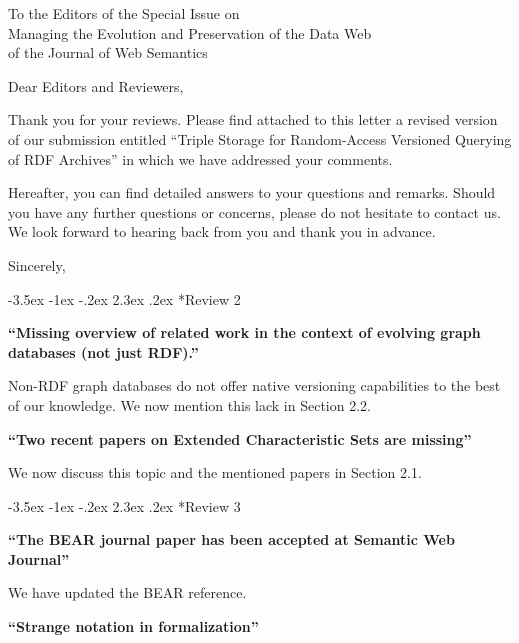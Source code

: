 \documentclass{letter}
\makeatletter
\newcounter{section}
\newcommand\section{\@startsection {section}{1}{\z@}%
                                   {-3.5ex \@plus -1ex \@minus -.2ex}%
                                   {2.3ex \@plus.2ex}%
                                   {\normalfont\Large\bfseries}}
\makeatother
\begin{document}
\begin{letter}{To the Editors of the Special Issue on\\Managing the Evolution and Preservation of the Data Web\\of the Journal of Web Semantics}

\opening{Dear Editors and Reviewers,}

\bigskip

Thank you for your reviews.
Please find attached to this letter a revised version of our submission entitled
\enquote{Triple Storage for Random-Access Versioned Querying of RDF Archives}
in which we have addressed your comments.

\bigskip

Hereafter, you can find detailed answers to your questions and remarks.
Should you have any further questions or concerns, please do not hesitate to contact us.
We look forward to hearing back from you and thank you in advance.

\bigskip

\closing{Sincerely,}

\pagebreak
\section*{Review 2}

\textbf{\enquote{Missing overview of related work in the context of evolving graph databases (not just RDF).}}

Non-RDF graph databases do not offer native versioning capabilities to the best of our knowledge.
We now mention this lack in Section 2.2.


\textbf{\enquote{Two recent papers on Extended Characteristic Sets are missing}}

We now discuss this topic and the mentioned papers in Section 2.1.

\section*{Review 3}

\textbf{\enquote{The BEAR journal paper has been accepted at Semantic Web Journal}}

We have updated the BEAR reference.

\textbf{\enquote{Strange notation in formalization}}


\end{letter}
\end{document}

